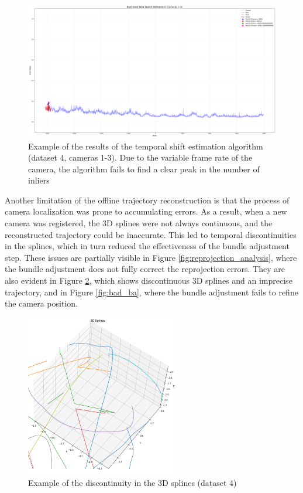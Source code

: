 \documentclass[11pt]{article}
\begin{document}
\begin{figure}[h]
    \centering
    \includegraphics[width=\textwidth]{../plots/search_results/dataset4/inliers_vs_beta_combined_cam1-3_ds4.png}
    \caption{Example of the results of the temporal shift estimation algorithm (dataset 4, cameras 1-3). Due to the variable frame rate of the camera, the algorithm fails to find a clear peak in the number of inliers}
    \label{fig:failed_beta_search}
\end{figure}

Another limitation of the offline trajectory reconstruction is that the process of camera localization was prone to accumulating errors. As a result, when a new camera was registered, the 3D splines were not always continuous, and the reconstructed trajectory could be inaccurate. This led to temporal discontinuities in the splines, which in turn reduced the effectiveness of the bundle adjustment step. These issues are partially visible in Figure \ref{fig:reprojection_analysis}, where the bundle adjustment does not fully correct the reprojection errors. They are also evident in Figure \ref{fig:splines_discontinuity}, which shows discontinuous 3D splines and an imprecise trajectory, and in Figure \ref{fig:bad_ba}, where the bundle adjustment fails to refine the camera position.

\begin{figure}[h]
    \centering
    \includegraphics[width=0.6\textwidth]{imgs/splines_discontinuity.png}
    \caption{Example of the discontinuity in the 3D splines (dataset 4)}
    \label{fig:splines_discontinuity}
\end{figure}
\end{document}
